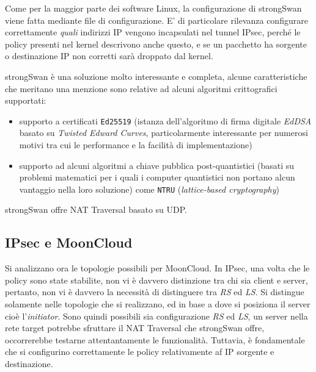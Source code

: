 Come per la maggior parte dei software Linux, la configurazione di strongSwan viene
fatta mediante file di configurazione.
E' di particolare rilevanza configurare correttamente \textit{quali} indirizzi IP vengono
incapsulati nel tunnel IPsec, perché le policy presenti nel kernel descrivono anche questo,
e se un pacchetto ha sorgente o destinazione IP non corretti sarà droppato dal kernel.

strongSwan è una soluzione molto interessante e completa, alcune caratteristiche
che meritano una menzione sono relative ad alcuni algoritmi crittografici supportati:
\begin{itemize}
  \item supporto a certificati \texttt{Ed25519} (istanza dell'algoritmo di firma digitale
  \textit{EdDSA} basato su \textit{Twisted Edward Curves},
  particolarmente interessante per numerosi motivi tra cui le
  performance e la facilità di implementazione)
  \item supporto ad alcuni algoritmi a chiave pubblica post-quantistici (basati su
  problemi matematici per i quali i computer quantistici non portano alcun vantaggio
  nella loro soluzione) come \texttt{NTRU} (\textit{lattice-based cryptography})
\end{itemize}
strongSwan offre NAT Traversal basato su UDP.


\subsection{IPsec e MoonCloud}
Si analizzano ora le topologie possibili per MoonCloud. In IPsec, una volta
che le policy sono state stabilite, non vi è davvero distinzione tra chi sia client e server, pertanto,
non vi è davvero la necessità di distinguere tra \textit{RS} ed \textit{LS}.
Si distingue solamente nelle topologie che si realizzano, ed in base a dove si posiziona il server cioè
l'\textit{initiator}.
Sono quindi possibili sia configurazione \textit{RS} ed \textit{LS}, un server nella rete target
potrebbe sfruttare il NAT Traversal che strongSwan offre, occorrerebbe testarne attentantamente
le funzionalità. Tuttavia, è fondamentale che si configurino correttamente le policy
relativamente af IP sorgente e destinazione.


